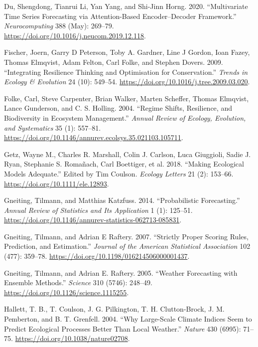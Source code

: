 \documentclass{article}
\newlength{\cslhangindent}
\newlength{\cslentryspacingunit} %
\newenvironment{CSLReferences}[2] %
 {%
  \setlength{\parindent}{0pt}
  \ifodd #1
  \let\oldpar\par
  \def\par{\hangindent=\cslhangindent\oldpar}
  \fi
  \setlength{\parskip}{#2\cslentryspacingunit}
 }%
 {}
\begin{document}
\begin{CSLReferences}{1}{0}
\leavevmode{}%
Du, Shengdong, Tianrui Li, Yan Yang, and Shi-Jinn Horng. 2020.
{``Multivariate Time Series Forecasting via Attention-Based
Encoder--Decoder Framework.''} \emph{Neurocomputing} 388 (May): 269--79.
\url{https://doi.org/10.1016/j.neucom.2019.12.118}.

\leavevmode{}%
Fischer, Joern, Garry D Peterson, Toby A. Gardner, Line J Gordon, Ioan
Fazey, Thomas Elmqvist, Adam Felton, Carl Folke, and Stephen Dovers.
2009. {``Integrating Resilience Thinking and Optimisation for
Conservation.''} \emph{Trends in Ecology \& Evolution} 24 (10): 549--54.
\url{https://doi.org/10.1016/j.tree.2009.03.020}.

\leavevmode{}%
Folke, Carl, Steve Carpenter, Brian Walker, Marten Scheffer, Thomas
Elmqvist, Lance Gunderson, and C. S. Holling. 2004. {``Regime {Shifts},
{Resilience}, and {Biodiversity} in {Ecosystem} {Management}.''}
\emph{Annual Review of Ecology, Evolution, and Systematics} 35 (1):
557--81. \url{https://doi.org/10.1146/annurev.ecolsys.35.021103.105711}.

\leavevmode{}%
Getz, Wayne M., Charles R. Marshall, Colin J. Carlson, Luca Giuggioli,
Sadie J. Ryan, Stephanie S. Romañach, Carl Boettiger, et al. 2018.
{``Making Ecological Models Adequate.''} Edited by Tim Coulson.
\emph{Ecology Letters} 21 (2): 153--66.
\url{https://doi.org/10.1111/ele.12893}.

\leavevmode{}%
Gneiting, Tilmann, and Matthias Katzfuss. 2014. {``Probabilistic
{Forecasting}.''} \emph{Annual Review of Statistics and Its Application}
1 (1): 125--51.
\url{https://doi.org/10.1146/annurev-statistics-062713-085831}.

\leavevmode{}%
Gneiting, Tilmann, and Adrian E Raftery. 2007. {``Strictly {Proper}
{Scoring} {Rules}, {Prediction}, and {Estimation}.''} \emph{Journal of
the American Statistical Association} 102 (477): 359--78.
\url{https://doi.org/10.1198/016214506000001437}.

\leavevmode{}%
Gneiting, Tilmann, and Adrian E. Raftery. 2005. {``Weather {Forecasting}
with {Ensemble} {Methods}.''} \emph{Science} 310 (5746): 248--49.
\url{https://doi.org/10.1126/science.1115255}.

\leavevmode{}%
Hallett, T. B., T. Coulson, J. G. Pilkington, T. H. Clutton-Brock, J. M.
Pemberton, and B. T. Grenfell. 2004. {``Why Large-Scale Climate Indices
Seem to Predict Ecological Processes Better Than Local Weather.''}
\emph{Nature} 430 (6995): 71--75.
\url{https://doi.org/10.1038/nature02708}.


\end{CSLReferences}
\end{document}
